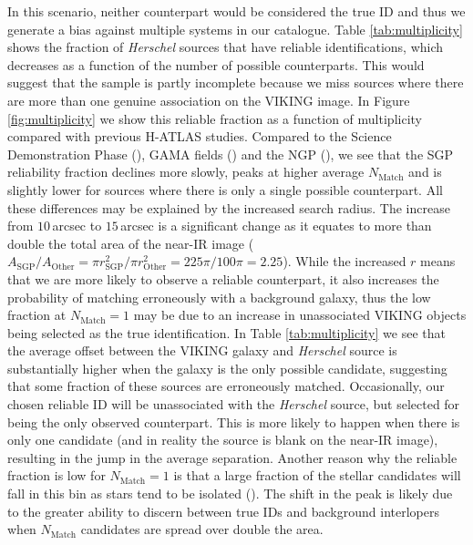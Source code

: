 In this scenario, neither counterpart would be considered the true ID and thus we generate a bias against multiple systems in our catalogue. Table \ref{tab:multiplicity} shows the fraction of \textit{Herschel} sources that have reliable identifications, which decreases as a function of the number of possible counterparts. This would suggest that the sample is partly incomplete because we miss sources where there are more than one genuine association on the VIKING image. In Figure \ref{fig:multiplicity} we show this reliable fraction as a function of multiplicity compared with previous H-ATLAS studies. Compared to the Science Demonstration Phase (\citealt{Fleuren_2012}), GAMA fields (\citealt{Bourne_2016}) and the NGP (\citealt{Furlanetto_2018}), we see that the SGP reliability fraction declines more slowly, peaks at higher average $N_{\textrm{Match}}$ and is slightly lower for sources where there is only a single possible counterpart. All these differences may be explained by the increased search radius. The increase from $10\,$arcsec to $15\,$arcsec is a significant change as it equates to more than double the total area of the near-IR image ($A_{\textrm{SGP}}/A_{\textrm{Other}} = \pi r_{\textrm{SGP}}^2/\pi r_{\textrm{Other}}^2 = 225\pi/100\pi = 2.25$). While the increased $r$ means that we are more likely to observe a reliable counterpart, it also increases the probability of matching erroneously with a background galaxy, thus the low fraction at $N_{\textrm{Match}} = 1$ may be due to an increase in unassociated VIKING objects being selected as the true identification. In Table \ref{tab:multiplicity} we see that the average offset between the VIKING galaxy and \textit{Herschel} source is substantially higher when the galaxy is the only possible candidate, suggesting that some fraction of these sources are erroneously matched. Occasionally, our chosen reliable ID will be unassociated with the \textit{Herschel} source, but selected for being the only observed counterpart. This is more likely to happen when there is only one candidate (and in reality the source is blank on the near-IR image), resulting in the jump in the average separation. Another reason why the reliable fraction is low for $N_{\textrm{Match}} = 1$ is that a large fraction of the stellar candidates will fall in this bin as stars tend to be isolated (\citealt{Bourne_2016}). The shift in the peak is likely due to the greater ability to discern between true IDs and background interlopers when $N_{\textrm{Match}}$ candidates are spread over double the area.

